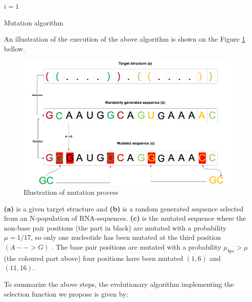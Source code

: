 \documentclass[english,12pt,a4paper]{article}
\theoremstyle{definition}
\begin{document}
\begin{algorithm}[H]
	$i = 1 $\;
	\caption{Mutation algorithm}
\end{algorithm}

An illustration of the execution of the above algorithm is shown on the Figure \ref{Fig:mut1} bellow.\\
\begin{figure}[H]
		\centering
		\includegraphics[width=.9\linewidth]{images/mutation_example.png}
		\caption{Illustration of mutation process}\label{Fig:mut1}
		
\end{figure}
\medskip
\small
\textbf{(a)} is a given target structure and \textbf{(b)} is a random generated sequence selected from an N-population of RNA-sequences. \textbf{(c)}  is the mutated sequence where the non-base pair positions (the part in black) are mutated with a probability $\mu = 1/17$, so only one nucleotide has been mutated at the third position $(A-->G)$ . The base pair positions are mutated with a probability $ \mu_{bps}>\mu $ (the coloured part above) four positions have been mutated $(1,6)$ and $(11, 16)$.

To summarize the above steps,  the evolutionary algorithm implementing the selection function we propose is given by: 
\end{document}
